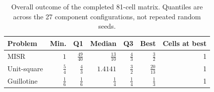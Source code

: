 \begin{table}[tbp]
\centering
\caption{Overall outcome of the completed 81-cell matrix. Quantiles are across the 27 component configurations, not repeated random seeds.}
\label{tab:problem-summary}
\begin{tabular}{lrrrrrr}
\toprule
Problem & Min. & Q1 & Median & Q3 & Best & Cells at best \\
\midrule
MISR & $1$ & $\frac{49}{40}$ & $\frac{13}{10}$ & $\frac{4}{3}$ & $\frac{3}{2}$ & 1 \\
Unit-square & $\frac{5}{4}$ & $\frac{4}{3}$ & $1.4141$ & $\frac{3}{2}$ & $\frac{20}{13}$ & 1 \\
Guillotine & $\frac{1}{6}$ & $\frac{1}{6}$ & $\frac{1}{4}$ & $\frac{1}{4}$ & $\frac{1}{3}$ & 1 \\
\bottomrule
\end{tabular}
\end{table}
